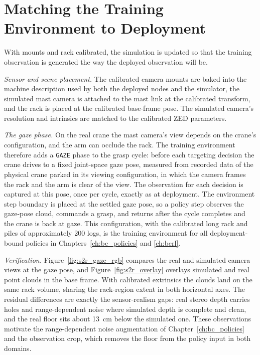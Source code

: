 \section{Matching the Training Environment to Deployment}
\label{sec:s2r_gaze}

With mounts and rack calibrated, the simulation is updated so that the
training observation is generated the way the deployed observation will be.

\emph{Sensor and scene placement.} The calibrated camera mounts are baked
into the machine description used by both the deployed nodes and the
simulator, the simulated mast camera is attached to the mast link at the
calibrated transform, and the rack is placed at the calibrated base-frame
pose. The simulated camera's resolution and intrinsics are matched to the
calibrated ZED parameters.

\emph{The gaze phase.} On the real crane the mast camera's view depends on
the crane's configuration, and the arm can occlude the rack. The training
environment therefore adds a \texttt{GAZE} phase to the grasp cycle: before
each targeting decision the crane drives to a fixed joint-space gaze pose,
measured from recorded data of the physical crane parked in its viewing
configuration, in which the camera frames the rack and the arm is clear of
the view. The observation for each decision is captured at this pose, once
per cycle, exactly as at deployment. The environment step boundary is placed
at the settled gaze pose, so a policy step observes the gaze-pose cloud,
commands a grasp, and returns after the cycle completes and the crane is
back at gaze. This configuration, with the calibrated long rack and piles of
approximately 200 logs, is the training environment for all deployment-bound
policies in Chapters~\ref{ch:bc_policies} and \ref{ch:bcrl}.

\emph{Verification.} Figure~\ref{fig:s2r_gaze_rgb} compares the real and
simulated camera views at the gaze pose, and Figure~\ref{fig:s2r_overlay}
overlays simulated and real point clouds in the base frame. With calibrated
extrinsics the clouds land on the same rack volume, sharing the rack-region
extent in both horizontal axes. The residual differences are exactly the
sensor-realism gaps: real stereo depth carries holes and range-dependent
noise where simulated depth is complete and clean, and the real floor sits
about 13~cm below the simulated one. These observations motivate the
range-dependent noise augmentation of
Chapter~\ref{ch:bc_policies} and the observation crop, which
removes the floor from the policy input in both domains.

